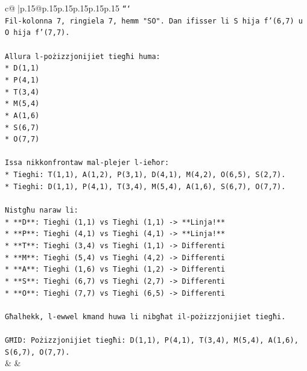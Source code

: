 \documentclass{article}
\begin{document}
{\begin{supertabular}{c@{$\;$}|p{.15\linewidth}@{}p{.15\linewidth}p{.15\linewidth}p{.15\linewidth}p{.15\linewidth}p{.15\linewidth}}
{{{\texttt{```} \\
\texttt{Fil{-}kolonna 7, ringiela 7, hemm "SO". Dan ifisser li S hija f'(6,7) u O hija f'(7,7).} \\
\\ 
\texttt{Allura l{-}pożizzjonijiet tiegħi huma:} \\
\texttt{*   D(1,1)} \\
\texttt{*   P(4,1)} \\
\texttt{*   T(3,4)} \\
\texttt{*   M(5,4)} \\
\texttt{*   A(1,6)} \\
\texttt{*   S(6,7)} \\
\texttt{*   O(7,7)} \\
\\ 
\texttt{Issa nikkonfrontaw mal{-}plejer l{-}ieħor:} \\
\texttt{*   Tieghi: T(1,1), A(1,2), P(3,1), D(4,1), M(4,2), O(6,5), S(2,7).} \\
\texttt{*   Tieghi: D(1,1), P(4,1), T(3,4), M(5,4), A(1,6), S(6,7), O(7,7).} \\
\\ 
\texttt{Nistgħu naraw li:} \\
\texttt{*   **D**: Tieghi (1,1) vs Tieghi (1,1) {-}> **Linja!**} \\
\texttt{*   **P**: Tieghi (4,1) vs Tieghi (4,1) {-}> **Linja!**} \\
\texttt{*   **T**: Tieghi (3,4) vs Tieghi (1,1) {-}> Differenti} \\
\texttt{*   **M**: Tieghi (5,4) vs Tieghi (4,2) {-}> Differenti} \\
\texttt{*   **A**: Tieghi (1,6) vs Tieghi (1,2) {-}> Differenti} \\
\texttt{*   **S**: Tieghi (6,7) vs Tieghi (2,7) {-}> Differenti} \\
\texttt{*   **O**: Tieghi (7,7) vs Tieghi (6,5) {-}> Differenti} \\
\\ 
\texttt{Għalhekk, l{-}ewwel kmand huwa li nibgħat il{-}pożizzjonijiet tiegħi.} \\
\\ 
\texttt{GĦID: Pożizzjonijiet tiegħi: D(1,1), P(4,1), T(3,4), M(5,4), A(1,6), S(6,7), O(7,7).} \\
            }
        }
    }
    & & \\ \\


\end{supertabular}}
\end{document}

